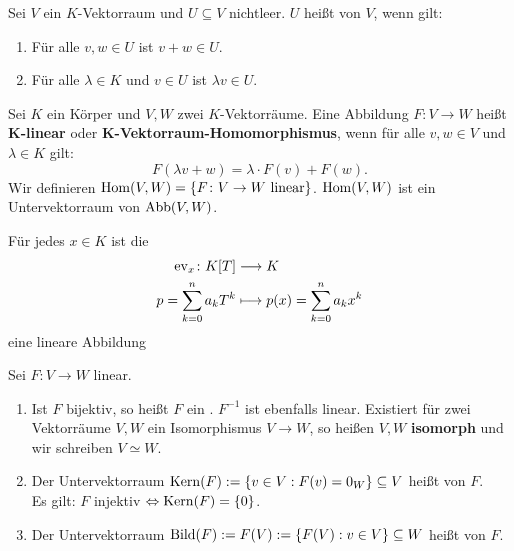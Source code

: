 \setcounter{definition}{3}
\begin{definition}[Untervektorraum]
	\label{def:I.5.4}
	Sei $V$ ein $K$-Vektorraum und $U \subseteq V$ nichtleer.
	$U$ heißt  von $V$, wenn gilt:
	\begin{enumerate}[(1)]
		\item Für alle $v,w \in U$ ist $v+w \in U$.
		\item Für alle $\lambda \in K$ und $v \in U$ ist $\lambda v \in U$.
	\end{enumerate}
\end{definition}

\setcounter{definition}{6}
\begin{definition}
	\label{def:I.5.7}
	Sei $K$ ein Körper und $V,W$ zwei $K$-Vektorräume.
	Eine Abbildung $F \colon V \rightarrow W$ heißt $\mathbf{K}$\textbf{-linear} oder $\mathbf{K}$\textbf{-Vektorraum-Homomorphismus}, wenn für alle $v,w \in V$ und $\lambda \in K$ gilt:
	\[
		F(\lambda v + w) = \lambda \cdot F(v) + F(w).
	\]
	Wir definieren $\operatorname{Hom}(V,W) = \{F \colon V \rightarrow W \text{ linear}\}$.
	$\operatorname{Hom}(V,W)$ ist ein Untervektorraum von $\operatorname{Abb}(V,W)$.
\end{definition}

\begin{beispiel}[Auswertungsabbildung]
	\label{bsp:I.5.8}
	Für jedes $x \in K$ ist die 
	\begin{align*}
		\operatorname{ev}_x \colon K[T] &\longrightarrow K \\
		p = \sum_{k=0}^{n} a_kT^k &\longmapsto p(x) = \sum_{k=0}^{n} a_kx^k
	\end{align*}
	eine lineare Abbildung
\end{beispiel}

\begin{definition}
	\label{def:I.5.9}
	Sei $F\colon V \rightarrow W$ linear.
	\begin{enumerate}[(1)]
		\item Ist $F$ bijektiv, so heißt $F$ ein .
		$F^{-1}$ ist ebenfalls linear.
		Existiert für zwei Vektorräume $V,W$ ein Isomorphismus $V \rightarrow W$, so heißen $V,W$ \textbf{isomorph} und wir schreiben $V \simeq W$.
		\item Der Untervektorraum $\operatorname{Kern}(F) := \{v \in V : F(v) = 0_W\} \subseteq V$ heißt  von $F$. \\
		Es gilt: $F$ injektiv $\Leftrightarrow \operatorname{Kern}(F) = \{0\}$.
		\item Der Untervektorraum $\operatorname{Bild}(F) := F(V) := \{F(V) : v \in V\} \subseteq W$ heißt  von $F$.
	\end{enumerate}
\end{definition}
\newpage